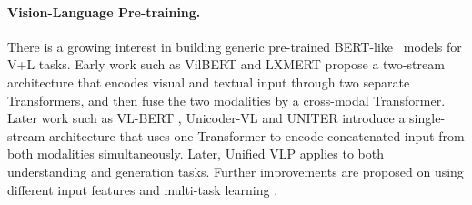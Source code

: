 \documentclass[final]{cvpr}
\newcommand{\luowei}[1]{\textcolor{cyan}{\small{\bf [Luowei: #1 ]}}}
\newcommand{\mingyang}[1]{\textcolor{brown}{\small{\bf [Mingyang: #1 ]}}}
\begin{document}
\paragraph{Vision-Language Pre-training.}
There is a growing interest in building generic pre-trained BERT-like~\cite{BERT} models for V+L tasks. Early work such as VilBERT \cite{vilbert} and LXMERT \cite{tan2019lxmert} propose a two-stream architecture that encodes visual and textual input through two separate Transformers, and then fuse the two modalities by a cross-modal Transformer. Later work such as VL-BERT \cite{su2020vlbert}, Unicoder-VL\cite{unicodervl} and UNITER \cite{UNITER} introduce a single-stream architecture that uses one Transformer to encode concatenated input from both modalities simultaneously. Later, Unified VLP \cite{zhou2019vlp} applies to both understanding and generation tasks. Further improvements are proposed on using different input features \cite{OSCAR, huang2020pixelbert} and multi-task learning \cite{lu202012in1}. %

\vspace{-3mm}
\end{document}
